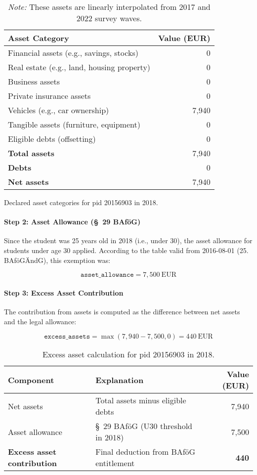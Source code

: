 \begin{table}[H]
\scriptsize
\centering
\begin{tabular}{lr}
\toprule
\textbf{Asset Category} & \textbf{Value (EUR)} \\
\midrule
Financial assets (e.g., savings, stocks) & 0 \\
Real estate (e.g., land, housing property) & 0 \\
Business assets & 0 \\
Private insurance assets & 0 \\
Vehicles (e.g., car ownership) & 7,940 \\
Tangible assets (furniture, equipment) & 0 \\
Eligible debts (offsetting) & 0 \\
\midrule
\textbf{Total assets} & 7,940 \\
\textbf{Debts} & 0 \\
\textbf{Net assets} & 7,940 \\
\bottomrule
\end{tabular}
\caption{Declared asset categories for pid 20156903 in 2018.}
\caption*{\textit{Note:} These assets are linearly interpolated from 2017 and 2022 survey waves.}
\label{table:bafoeg_declared_assets}
\end{table}

\paragraph{Step 2: Asset Allowance (§~29 BAföG)}

Since the student was 25 years old in 2018 (i.e., under 30), the asset allowance for students under age 30 applied. According to the table valid from 2016-08-01 (25. BAföGÄndG), this exemption was:

\[
\texttt{asset\_allowance} = 7{,}500~\text{EUR}
\]

\paragraph{Step 3: Excess Asset Contribution}

The contribution from assets is computed as the difference between net assets and the legal allowance:

\[
\texttt{excess\_assets} = \max(7{,}940 - 7{,}500, 0) = 440~\text{EUR}
\]

\begin{table}[H]
\scriptsize
\centering
\begin{tabular}{llr}
\toprule
\textbf{Component} & \textbf{Explanation} & \textbf{Value (EUR)} \\
\midrule
Net assets & Total assets minus eligible debts & 7,940 \\
Asset allowance & §~29 BAföG (U30 threshold in 2018) & 7,500 \\
\midrule
\textbf{Excess asset contribution} & Final deduction from BAföG entitlement & \textbf{440} \\
\bottomrule
\end{tabular}
\caption{Excess asset calculation for pid 20156903 in 2018.}
\label{table:bafoeg_excess_assets}
\end{table}


